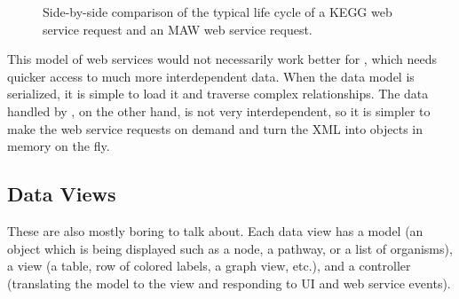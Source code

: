 \begin{figure}[hbt]
    \caption{\label{fig:kegg_impl_web_service_differences} Side-by-side
    comparison of the typical life cycle of a KEGG web service request and an
    MAW web service request.}
\end{figure}

This model of web services would not necessarily work better for \mawapp,
which needs quicker access to much more interdependent data. When the data model
is serialized, it is simple to load it and traverse complex relationships. The
data handled by \keggapp, on the other hand, is not very interdependent, so
it is simpler to make the web service requests on demand and turn the XML into
objects in memory on the fly.

\subsection{Data Views}
\label{sect:kegg_impl_data_views}

These are also mostly boring to talk about. Each data view has a model (an
object which is being displayed such as a node, a pathway, or a list of
organisms), a view (a table, row of colored labels, a graph view, etc.), and a
controller (translating the model to the view and responding to UI and web
service events).

